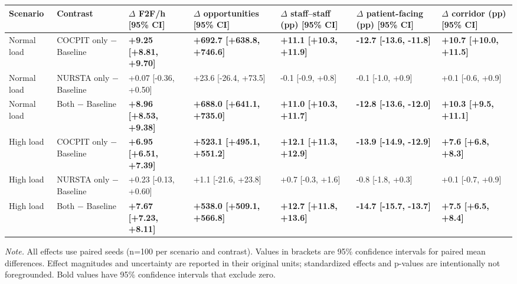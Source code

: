 \begin{tabular}{lllllll}
\toprule
\textbf{Scenario} & \textbf{Contrast} & \textbf{\ensuremath{\Delta} F2F/h [95\% CI]} & \textbf{\ensuremath{\Delta} opportunities [95\% CI]} & \textbf{\ensuremath{\Delta} staff--staff (pp) [95\% CI]} & \textbf{\ensuremath{\Delta} patient-facing (pp) [95\% CI]} & \textbf{\ensuremath{\Delta} corridor (pp) [95\% CI]} \\
\midrule
Normal load & COCPIT only \ensuremath{-} Baseline & \textbf{+9.25 [+8.81, +9.70]} & \textbf{+692.7 [+638.8, +746.6]} & \textbf{+11.1 [+10.3, +11.9]} & \textbf{-12.7 [-13.6, -11.8]} & \textbf{+10.7 [+10.0, +11.5]} \\
Normal load & NURSTA only \ensuremath{-} Baseline & +0.07 [-0.36, +0.50] & +23.6 [-26.4, +73.5] & -0.1 [-0.9, +0.8] & -0.1 [-1.0, +0.9] & +0.1 [-0.6, +0.9] \\
Normal load & Both \ensuremath{-} Baseline & \textbf{+8.96 [+8.53, +9.38]} & \textbf{+688.0 [+641.1, +735.0]} & \textbf{+11.0 [+10.3, +11.7]} & \textbf{-12.8 [-13.6, -12.0]} & \textbf{+10.3 [+9.5, +11.1]} \\
\addlinespace[2pt]
High load & COCPIT only \ensuremath{-} Baseline & \textbf{+6.95 [+6.51, +7.39]} & \textbf{+523.1 [+495.1, +551.2]} & \textbf{+12.1 [+11.3, +12.9]} & \textbf{-13.9 [-14.9, -12.9]} & \textbf{+7.6 [+6.8, +8.3]} \\
High load & NURSTA only \ensuremath{-} Baseline & +0.23 [-0.13, +0.60] & +1.1 [-21.6, +23.8] & +0.7 [-0.3, +1.6] & -0.8 [-1.8, +0.3] & +0.1 [-0.7, +0.9] \\
High load & Both \ensuremath{-} Baseline & \textbf{+7.67 [+7.23, +8.11]} & \textbf{+538.0 [+509.1, +566.8]} & \textbf{+12.7 [+11.8, +13.6]} & \textbf{-14.7 [-15.7, -13.7]} & \textbf{+7.5 [+6.5, +8.4]} \\
\bottomrule
\end{tabular}

\par\footnotesize\textit{Note.} All effects use paired seeds (n=100 per scenario and contrast). Values in brackets are 95\% confidence intervals for paired mean differences. Effect magnitudes and uncertainty are reported in their original units; standardized effects and p-values are intentionally not foregrounded. Bold values have 95\% confidence intervals that exclude zero.
